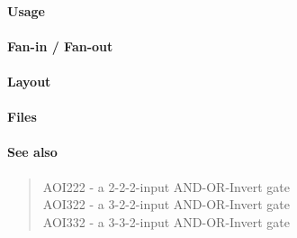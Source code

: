 \paragraph{Usage}

\paragraph{Fan-in / Fan-out}

\paragraph{Layout}

\paragraph{Files}

\paragraph{See also}
\begin{quote}
    AOI222 - a 2-2-2-input AND-OR-Invert gate \\
    AOI322 - a 3-2-2-input AND-OR-Invert gate \\
    AOI332 - a 3-3-2-input AND-OR-Invert gate
\end{quote}
